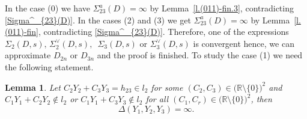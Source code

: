 \documentclass[preprint,12pt]{elsarticle}
\newtheorem{lem}[thm]{Lemma}
\numberwithin{equation}{section}
\begin{document}
In the case (0) we have $\Sigma^{a}_{23}(D)=\infty$ by Lemma~\ref{l.(011)-fin.3},
contradicting \eqref{Sigma^_{23}(D)}. In the cases (2) and (3) we get $\Sigma^{a}_{23}(D)=\infty$ by Lemma~\ref{l.(011)-fin}, contradicting \eqref{Sigma^_{23}(D)}.
Therefore, one of the expressions $\Sigma_2(D,s),\,\Sigma^{\vee}_2(D,s),\,$
$\Sigma_3(D,s)$ or $\Sigma^{\vee}_3(D,s)$ is convergent hence, we can approximate $D_{2n}$ or $D_{3n}$ and the proof is finished.
To study the case (1) we need the following statement.
\begin{lem}
\label{l.Delta(2,3)} 
 Let $ C_2Y_2+C_3Y_3=h_{23}\in l_2$ for some $(C_2,C_3)\in \big(\mathbb R \setminus \{0\}\big)^2$
and  $C_1Y_1\!+\!C_2Y_2\not\in l_2$ or $C_1Y_1\!+\!C_3Y_3\not\in l_2$ for all $ (C_1,C_r)\in \big(\mathbb R \setminus \{0\}\big)^2$,  then
\begin{equation}
\label{Delta(2,3)}
\Delta(Y_1,Y_2,Y_3)=
\infty.
\end{equation}
\end{lem} 
\end{document}
